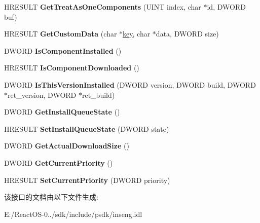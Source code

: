\begin{DoxyCompactItemize}
\item 
\mbox{\label{interface_i_cif_component_ac22b4826f3f5748bf0d6fcf8a4bc7c3a}} 
H\+R\+E\+S\+U\+LT {\bfseries Get\+Treat\+As\+One\+Components} (U\+I\+NT index, char $\ast$id, D\+W\+O\+RD buf)
\item 
\mbox{\label{interface_i_cif_component_a8239d4616142434ebb6e8bf154491a32}} 
H\+R\+E\+S\+U\+LT {\bfseries Get\+Custom\+Data} (char $\ast$\hyperlink{structkey}{key}, char $\ast$data, D\+W\+O\+RD size)
\item 
\mbox{\label{interface_i_cif_component_ad6f8b0ae9fc3bd38bd06893aefa4592b}} 
D\+W\+O\+RD {\bfseries Is\+Component\+Installed} ()
\item 
\mbox{\label{interface_i_cif_component_a569a8cef92e86ed6c098a992b2c5a972}} 
H\+R\+E\+S\+U\+LT {\bfseries Is\+Component\+Downloaded} ()
\item 
\mbox{\label{interface_i_cif_component_a1ab3695745d122e3cbafc4d7fd3edbf1}} 
D\+W\+O\+RD {\bfseries Is\+This\+Version\+Installed} (D\+W\+O\+RD version, D\+W\+O\+RD build, D\+W\+O\+RD $\ast$ret\+\_\+version, D\+W\+O\+RD $\ast$ret\+\_\+build)
\item 
\mbox{\label{interface_i_cif_component_a07309cec95e8528f0cb2afd1d8b95c47}} 
D\+W\+O\+RD {\bfseries Get\+Install\+Queue\+State} ()
\item 
\mbox{\label{interface_i_cif_component_ad4ee5b82e69841bee59d16977c7bf0a9}} 
H\+R\+E\+S\+U\+LT {\bfseries Set\+Install\+Queue\+State} (D\+W\+O\+RD state)
\item 
\mbox{\label{interface_i_cif_component_ae8dd0166d04169ec5c4761ad0663485d}} 
D\+W\+O\+RD {\bfseries Get\+Actual\+Download\+Size} ()
\item 
\mbox{\label{interface_i_cif_component_adfb9fabf2533cf3f9dd31e0423b863ce}} 
D\+W\+O\+RD {\bfseries Get\+Current\+Priority} ()
\item 
\mbox{\label{interface_i_cif_component_a0973bc953de1c1487853283bfd53933d}} 
H\+R\+E\+S\+U\+LT {\bfseries Set\+Current\+Priority} (D\+W\+O\+RD priority)
\end{DoxyCompactItemize}


该接口的文档由以下文件生成\+:\begin{DoxyCompactItemize}
\item 
E\+:/\+React\+O\+S-\/0../sdk/include/psdk/inseng.\+idl\end{DoxyCompactItemize}
